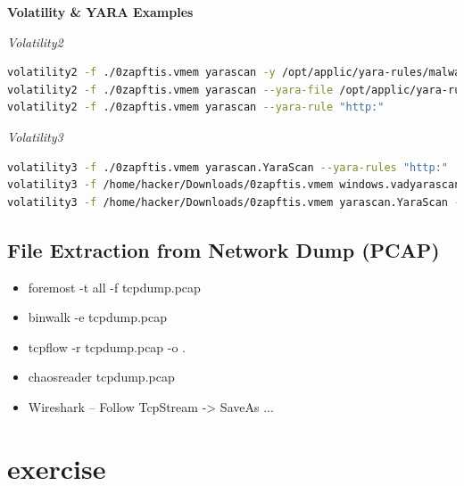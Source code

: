 \textbf{Volatility \& YARA Examples}

\textit{Volatility2}
\begin{lstlisting}[language=bash]
volatility2 -f ./0zapftis.vmem yarascan -y /opt/applic/yara-rules/malware/MALW_LuaBot.yar
volatility2 -f ./0zapftis.vmem yarascan --yara-file /opt/applic/yara-rules/malware/MALW_LuaBot.yar
volatility2 -f ./0zapftis.vmem yarascan --yara-rule "http:"
\end{lstlisting}

\textit{Volatility3}
\begin{lstlisting}[language=bash]
volatility3 -f ./0zapftis.vmem yarascan.YaraScan --yara-rules "http:"
volatility3 -f /home/hacker/Downloads/0zapftis.vmem windows.vadyarascan.VadYaraScan --yara-file ./packers_index.yar
volatility3 -f /home/hacker/Downloads/0zapftis.vmem yarascan.YaraScan --yara-file ./packers_index.yar
\end{lstlisting}

\subsection{File Extraction from Network Dump (PCAP)}
\begin{itemize}
  \item foremost -t all -f tcpdump.pcap
  \item binwalk -e tcpdump.pcap
  \item tcpflow -r tcpdump.pcap -o .
  \item chaosreader tcpdump.pcap
  \item Wireshark – Follow TcpStream -> SaveAs ...
\end{itemize}


\section{exercise}
